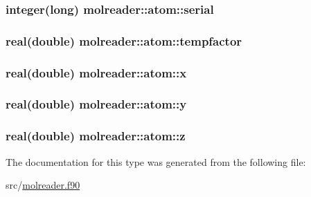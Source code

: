 \hypertarget{structmolreader_1_1atom_a4843d34d24db6a30c5c0c199d4a09cdb}{
\subsubsection[{serial}]{\setlength{\rightskip}{0pt plus 5cm}integer(long) molreader\-::atom\-::serial\hspace{0.3cm}{\ttfamily [private]}}}\label{structmolreader_1_1atom_a4843d34d24db6a30c5c0c199d4a09cdb}
\hypertarget{structmolreader_1_1atom_a07cd48fa61d17ae1319fa643fda2b160}{
\subsubsection[{tempfactor}]{\setlength{\rightskip}{0pt plus 5cm}real(double) molreader\-::atom\-::tempfactor\hspace{0.3cm}{\ttfamily [private]}}}\label{structmolreader_1_1atom_a07cd48fa61d17ae1319fa643fda2b160}
\hypertarget{structmolreader_1_1atom_a2fe09429b1c06d0037917dbc658f599c}{
\subsubsection[{x}]{\setlength{\rightskip}{0pt plus 5cm}real(double) molreader\-::atom\-::x\hspace{0.3cm}{\ttfamily [private]}}}\label{structmolreader_1_1atom_a2fe09429b1c06d0037917dbc658f599c}
\hypertarget{structmolreader_1_1atom_ad723df4b3102cd459daf1896014f5a1e}{
\subsubsection[{y}]{\setlength{\rightskip}{0pt plus 5cm}real(double) molreader\-::atom\-::y\hspace{0.3cm}{\ttfamily [private]}}}\label{structmolreader_1_1atom_ad723df4b3102cd459daf1896014f5a1e}
\hypertarget{structmolreader_1_1atom_ad68c754042ba9fd277d59c6caf9bc570}{
\subsubsection[{z}]{\setlength{\rightskip}{0pt plus 5cm}real(double) molreader\-::atom\-::z\hspace{0.3cm}{\ttfamily [private]}}}\label{structmolreader_1_1atom_ad68c754042ba9fd277d59c6caf9bc570}


The documentation for this type was generated from the following file\-:\begin{DoxyCompactItemize}
\item 
src/\hyperlink{molreader_8f90}{molreader.\-f90}\end{DoxyCompactItemize}
